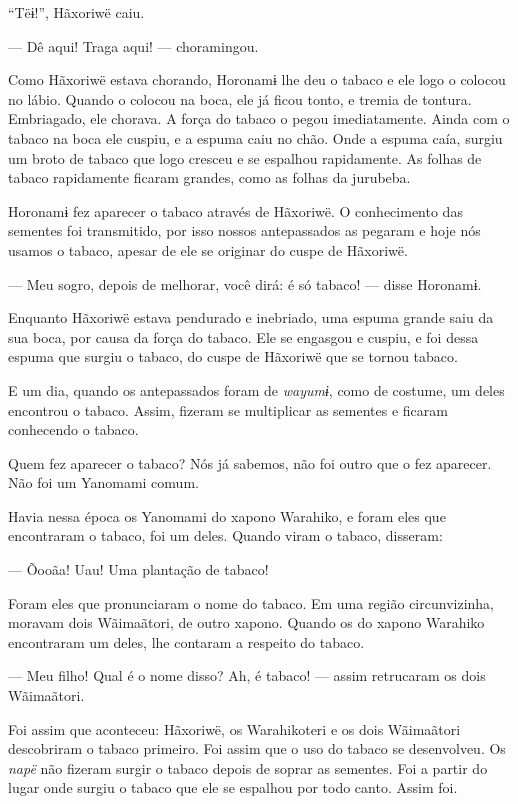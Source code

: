 ``Tëɨ!'', Hãxoriwë caiu. 

--- Dê aqui! Traga aqui! --- choramingou. 

 Como Hãxoriwë estava chorando, Horonamɨ lhe deu o tabaco e ele
logo o colocou no lábio. Quando o colocou na boca, ele já ficou tonto, e
tremia de tontura. Embriagado, ele chorava. A força do tabaco o pegou
imediatamente. Ainda com o tabaco na boca ele cuspiu, e a espuma caiu no
chão. Onde a espuma caía, surgiu um broto de tabaco que logo cresceu e
se espalhou rapidamente. As folhas de tabaco rapidamente ficaram
grandes, como as folhas da jurubeba. 

 Horonamɨ fez aparecer o tabaco através de Hãxoriwë. O conhecimento das sementes foi transmitido, por isso nossos antepassados
as pegaram e hoje nós usamos o tabaco, apesar de ele se originar do
cuspe de Hãxoriwë. 

--- Meu sogro, depois de melhorar, você dirá: é só tabaco! --- disse
Horonamɨ. 

Enquanto Hãxoriwë estava pendurado e inebriado, uma espuma grande saiu
da sua boca, por causa da força do tabaco. Ele se engasgou e cuspiu, e
foi dessa espuma que surgiu o tabaco, do cuspe de Hãxoriwë que se tornou
tabaco. 

E um dia, quando os antepassados foram de \emph{wayumɨ}, como de
costume, um deles encontrou o tabaco. Assim, fizeram se multiplicar as
sementes e ficaram conhecendo o tabaco. 

Quem fez aparecer o tabaco? Nós já sabemos, não foi outro que o fez
aparecer. Não foi um Yanomami comum. 

Havia nessa época os Yanomami do xapono\emph{ }Warahiko, e foram eles
que encontraram o tabaco, foi um deles. Quando viram o tabaco,
disseram: 

--- Õooãa! Uau! Uma plantação de tabaco! 

Foram eles que pronunciaram o nome do tabaco. Em uma região
circunvizinha, moravam dois Wãimaãtori, de outro xapono. Quando os do
xapono\emph{ }Warahiko encontraram um deles, lhe contaram a respeito do
tabaco. 

--- Meu filho! Qual é o nome disso? Ah, é tabaco! --- assim retrucaram
os dois Wãimaãtori. 

Foi assim que aconteceu: Hãxoriwë, os Warahikoteri e os dois Wãimaãtori
descobriram o tabaco primeiro. Foi assim que o uso do tabaco se
desenvolveu. Os \emph{napë} não fizeram surgir o tabaco depois de soprar
as sementes. Foi a partir do lugar onde surgiu o tabaco que ele se
espalhou por todo canto. Assim foi. 

